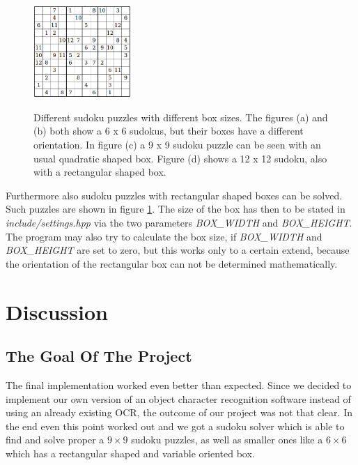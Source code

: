 \documentclass[
a4paper,     %
12pt         %
]{scrartcl}  %
\begin{document}
\begin{figure}[!bhp]
\begin{center}
\begin{minipage}[h]{3.8cm}
       \label{fig:9x9}
       \subcaption{}
     \end{minipage}
     \begin{minipage}[h]{3.9cm}
       \includegraphics[height=3.5cm]{imgs/solver_12x12.png}
       \label{fig:12x12}
       \subcaption{}
     \end{minipage}     
     \caption[Different sudoku puzzles with different box sizes]{\scriptsize{Different sudoku puzzles with different box sizes.
       The figures (a) and (b) both show a 6 x 6 sudokus, but their boxes have a different orientation. In figure (c) a 9 x 9
       sudoku puzzle can be seen with an usual quadratic shaped box. Figure (d) shows a 12 x 12 sudoku, also with a rectangular shaped box.}}
     \label{fig:boxshapes}
   \end{center}
\end{figure} 
Furthermore also sudoku puzzles with rectangular shaped boxes can be solved. Such puzzles are shown in figure \ref{fig:boxshapes}.
The size of the box has then to be stated in \emph{include/settings.hpp} via the two parameters \emph{BOX\_WIDTH} and \emph{BOX\_HEIGHT}. The 
program may also try to calculate the box size, if \emph{BOX\_WIDTH} and \emph{BOX\_HEIGHT} are set to zero, but this works only to a 
certain extend, because the orientation of the rectangular box can not be determined mathematically.

\section{Discussion}

\subsection{The Goal Of The Project}
The final implementation worked even better than expected. Since we decided to implement our own version of an object character recognition 
software instead of using an already existing OCR, the outcome of our project was not that clear. In the end even this point worked out and
we got a sudoku solver which is able to find and solve proper a $9 \times 9$ sudoku puzzles, as well as smaller ones like 
a $6 \times 6$ which has a rectangular shaped and variable oriented box.
\end{document}
